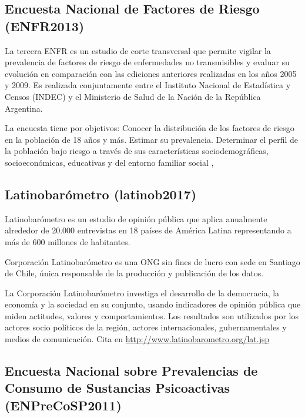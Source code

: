 \documentclass[]{book}
\begin{document}
\hypertarget{encuesta-nacional-de-factores-de-riesgo-enfr2013}{%
\subsection{Encuesta Nacional de Factores de Riesgo (ENFR2013)}\label{encuesta-nacional-de-factores-de-riesgo-enfr2013}}

La tercera ENFR es un estudio de corte transversal que permite vigilar la prevalencia de factores de riesgo de enfermedades no transmisibles y evaluar su evolución en comparación con las ediciones anteriores realizadas en los años 2005 y 2009. Es realizada conjuntamente entre el Instituto Nacional de Estadística y Censos (INDEC) y el Ministerio de Salud de la Nación de la República Argentina.

La encuesta tiene por objetivos: Conocer la distribución de los factores de riesgo en la población de 18 años y más. Estimar su prevalencia. Determinar el perfil de la población bajo riesgo a través de sus características sociodemográficas, socioeconómicas, educativas y del entorno familiar social \citet{msal2013}, \citet{INDEC2013a}

\hypertarget{latinobaruxf3metro-latinob2017}{%
\subsection{Latinobarómetro (latinob2017)}\label{latinobaruxf3metro-latinob2017}}

Latinobarómetro es un estudio de opinión pública que aplica anualmente alrededor de 20.000 entrevistas en 18 países de América Latina representando a más de 600 millones de habitantes.

Corporación Latinobarómetro es una ONG sin fines de lucro con sede en Santiago de Chile, única responsable de la producción y publicación de los datos.

La Corporación Latinobarómetro investiga el desarrollo de la democracia, la economía y la sociedad en su conjunto, usando indicadores de opinión pública que miden actitudes, valores y comportamientos. Los resultados son utilizados por los actores socio políticos de la región, actores internacionales, gubernamentales y medios de comunicación.
Cita en \url{http://www.latinobarometro.org/lat.jsp}

\hypertarget{encuesta-nacional-sobre-prevalencias-de-consumo-de-sustancias-psicoactivas-enprecosp2011}{%
\subsection{Encuesta Nacional sobre Prevalencias de Consumo de Sustancias Psicoactivas (ENPreCoSP2011)}\label{encuesta-nacional-sobre-prevalencias-de-consumo-de-sustancias-psicoactivas-enprecosp2011}}
\end{document}
